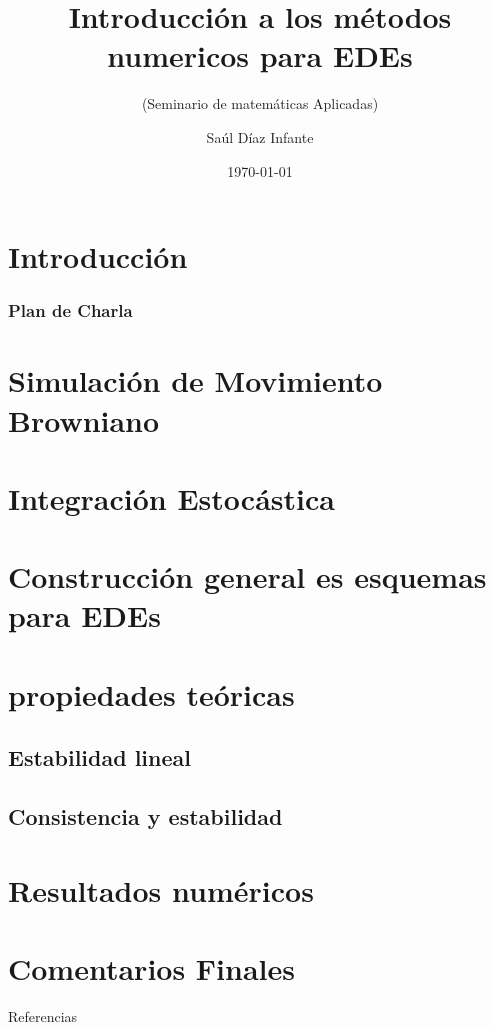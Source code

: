 \documentclass[spanish,10pt,xcolor=dvipsnames,table]{beamer}
\title{Introducción a los métodos numericos para EDEs }
\subtitle{(Seminario de matemáticas Aplicadas)}
\author[]{Sa\'ul D\'iaz Infante }
\institute{CIMAT A.C.}
\date\today
\theoremstyle{plain} %
\theoremstyle{definition}
\theoremstyle{definition}
\begin{document}
\frame{\titlepage \vspace{-0.5cm}}
\section*{Introducci\'on}
    
	\begin{frame}
		\frametitle{Plan de Charla}
    	\tableofcontents[pausesections]
  	\end{frame}
	\section{Simulación de Movimiento Browniano}
			
	\section{Integración Estocástica}
	\section{Construcción general es esquemas para EDEs}
	\section{propiedades teóricas}	
	\subsection{Estabilidad lineal}
    	
		
	 \subsection{Consistencia y estabilidad}
		
	\section{Resultados numéricos}
  	
  \section{Comentarios Finales}
 \appendix
  
\begin{frame}[allowframebreaks]{Referencias}
	
	
\end{frame}
\end{document}
